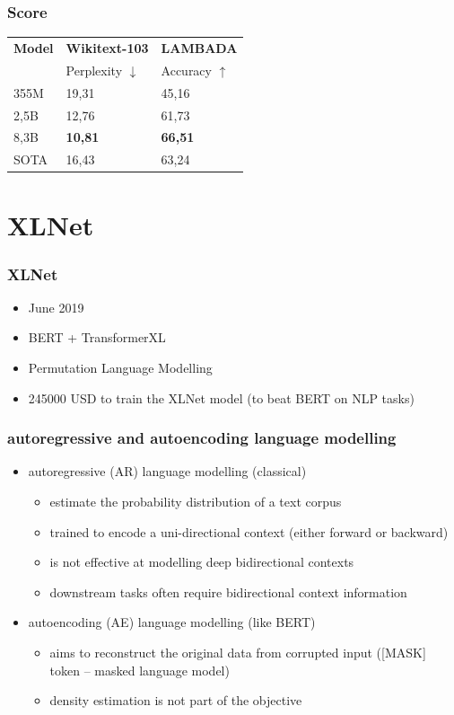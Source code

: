 \documentclass{beamer}
\begin{document}
\begin{frame}
    \frametitle{Score}
    \begin{center}
    	\begin{tabular}{l| l | l}
    	    \textbf{Model} & \textbf{Wikitext-103} & \textbf{LAMBADA} \\
    	     & Perplexity $\downarrow$ & Accuracy $\uparrow$ \\
    	    \hline
    	    355M & 19,31 & 45,16 \\
    	    2,5B & 12,76 & 61,73 \\
    	    8,3B & \textbf{10,81} & \textbf{66,51} \\
    		\hline
    	    SOTA & 16,43 & 63,24 \\
    	\end{tabular}
    \end{center}
\end{frame}



\section{XLNet}
\begin{frame}
    \frametitle{XLNet \cite{xlnet}}
    \begin{itemize}
        \item June 2019
        \item BERT + TransformerXL
        \item Permutation Language Modelling
        \item 245000 USD to train the XLNet model (to beat BERT on NLP tasks)
    \end{itemize}
\end{frame}

\begin{frame}
    \frametitle{autoregressive and autoencoding language modelling}
    \begin{itemize}
        \item autoregressive (AR) language modelling (classical)
        \begin{itemize}
            \item estimate the probability distribution of a text corpus
            \item trained to encode a uni-directional context (either forward or backward)
            \item is not effective at modelling deep bidirectional contexts
            \item downstream tasks often require bidirectional context information
        \end{itemize}
        \item autoencoding (AE) language modelling (like BERT)
        \begin{itemize}
            \item aims to reconstruct the original data from corrupted input ([MASK] token -- masked language model)
            \item density estimation is not part of the objective
        \end{itemize}
    \end{itemize}
\end{frame}
\end{document}
